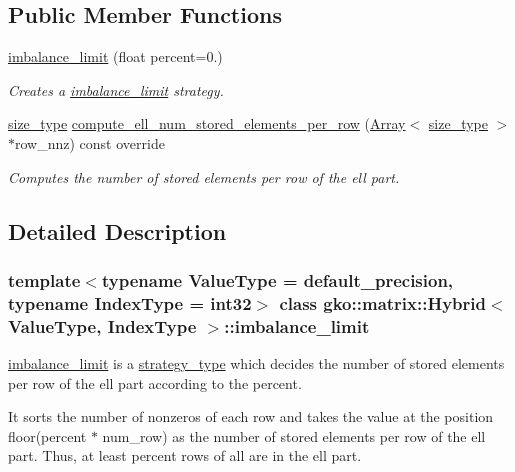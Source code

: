\subsection*{Public Member Functions}
\begin{DoxyCompactItemize}
\item 
\hyperlink{classgko_1_1matrix_1_1Hybrid_1_1imbalance__limit_ab546af3508d47185d6f5e6fb2f1412bc}{imbalance\+\_\+limit} (float percent=0.)
\begin{DoxyCompactList}\small\item\em Creates a \hyperlink{classgko_1_1matrix_1_1Hybrid_1_1imbalance__limit}{imbalance\+\_\+limit} strategy. \end{DoxyCompactList}\item 
\hyperlink{namespacegko_a6e5c95df0ae4e47aab2f604a22d98ee7}{size\+\_\+type} \hyperlink{classgko_1_1matrix_1_1Hybrid_1_1imbalance__limit_aa95250e2c38d516dbd2fbf5bdfa67e72}{compute\+\_\+ell\+\_\+num\+\_\+stored\+\_\+elements\+\_\+per\+\_\+row} (\hyperlink{classgko_1_1Array}{Array}$<$ \hyperlink{namespacegko_a6e5c95df0ae4e47aab2f604a22d98ee7}{size\+\_\+type} $>$ $\ast$row\+\_\+nnz) const override
\begin{DoxyCompactList}\small\item\em Computes the number of stored elements per row of the ell part. \end{DoxyCompactList}\end{DoxyCompactItemize}


\subsection{Detailed Description}
\subsubsection*{template$<$typename Value\+Type = default\+\_\+precision, typename Index\+Type = int32$>$\newline
class gko\+::matrix\+::\+Hybrid$<$ Value\+Type, Index\+Type $>$\+::imbalance\+\_\+limit}

\hyperlink{classgko_1_1matrix_1_1Hybrid_1_1imbalance__limit}{imbalance\+\_\+limit} is a \hyperlink{classgko_1_1matrix_1_1Hybrid_1_1strategy__type}{strategy\+\_\+type} which decides the number of stored elements per row of the ell part according to the percent. 

It sorts the number of nonzeros of each row and takes the value at the position {\ttfamily floor(percent $\ast$ num\+\_\+row)} as the number of stored elements per row of the ell part. Thus, at least {\ttfamily percent} rows of all are in the ell part. 

